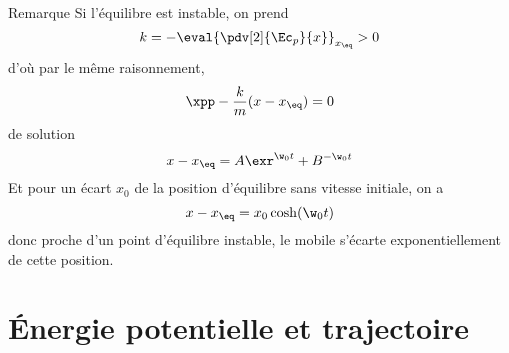 \documentclass[../main/main.tex]{subfiles}
\begin{document}
\begin{rrema}{Remarque}
    Si l'équilibre est instable, on prend
    \[k = - \eval{\pdv[2]{\Ec_p}{x}}_{x_{\eq}} > 0\]
    d'où par le même raisonnement,
    \[\xpp - \frac{k}{m}(x-x_{\eq}) = 0\]
    de solution
    \[x-x_{\eq} = A\exr^{\w_0t} + B^{-\w_0t}\]
    Et pour un écart $x_0$ de la position d'équilibre sans vitesse initiale, on
    a
    \[x - x_{\eq} = x_0\cosh(\w_0t)\]
    donc proche d'un point d'équilibre instable, le mobile s'écarte
    exponentiellement de cette position.
\end{rrema}

\section{Énergie potentielle et trajectoire}
\end{document}

